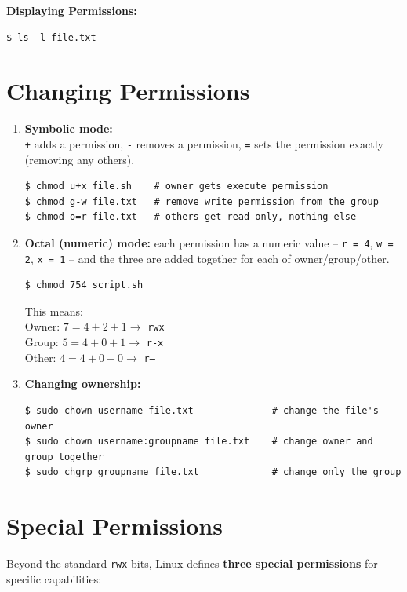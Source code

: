 \textbf{Displaying Permissions:}
\begin{lstlisting}[language=Terminal]
$ ls -l file.txt
\end{lstlisting}

\section{Changing Permissions}

\begin{enumerate}
    \item \textbf{Symbolic mode:}\\
    \texttt{+} adds a permission, \texttt{-} removes a permission, \texttt{=} sets the permission exactly (removing any others).
\begin{lstlisting}[language=Terminal]
$ chmod u+x file.sh    # owner gets execute permission
$ chmod g-w file.txt   # remove write permission from the group
$ chmod o=r file.txt   # others get read-only, nothing else
\end{lstlisting}

    \item \textbf{Octal (numeric) mode:} each permission has a numeric value -- \texttt{r = 4}, \texttt{w = 2}, \texttt{x = 1} -- and the three are added together for each of owner/group/other.
\begin{lstlisting}[language=Terminal]
$ chmod 754 script.sh
\end{lstlisting}
    This means:\\
    Owner: $7 = 4+2+1 \rightarrow$ \texttt{rwx}\\
    Group: $5 = 4+0+1 \rightarrow$ \texttt{r-x}\\
    Other: $4 = 4+0+0 \rightarrow$ \texttt{r--}

    \item \textbf{Changing ownership:}
\begin{lstlisting}[language=Terminal]
$ sudo chown username file.txt              # change the file's owner
$ sudo chown username:groupname file.txt    # change owner and group together
$ sudo chgrp groupname file.txt             # change only the group
\end{lstlisting}
\end{enumerate}

\section{Special Permissions}
Beyond the standard \texttt{rwx} bits, Linux defines \textbf{three special permissions} for specific capabilities:

